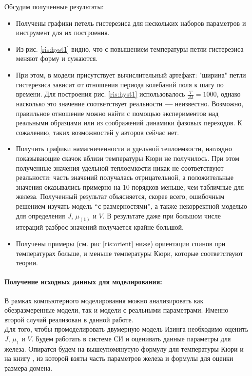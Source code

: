 \documentclass[oneside,final,14pt]{extarticle}
\begin{document}
	\noindent Обсудим полученные результаты:
	\begin{itemize}
		\item Получены графики петель гистерезиса для нескольких наборов параметров и инструмент для их построения.
		\item Из рис. \ref{ris:hyst1} видно, что с повышением температуры петли гистерезиса меняют форму и сужаются. 
		\item При этом, в модели присутствует вычислительный артефакт: "ширина" петли гистерезиса зависит от отношения периода колебаний поля к шагу по времени. Для построения рис. \ref{ris:hyst1} использовалось $\frac{T}{\Delta t}=1000$, однако насколько это значение соответствует реальности \textbf{---} неизвестно. Возможно, правильное отношение можно найти с помощью экспериментов над реальными образцами или из соображений динамики фазовых переходов. К сожалению, таких возможностей у авторов сейчас нет. 
		\item Получить графики намагниченности и удельной теплоемкости, наглядно показывающие скачок вблизи температуры Кюри не получилось. При этом полученные значения удельной теплоемкости никак не соответствуют реальности: часть значений получалась отрицательной, а положительные значения оказывались примерно на 10 порядков меньше, чем табличные для железа. Полученный результат объясняется, скорее всего, ошибочным решением изучать модель ``с размерностями'', а также некорректной моделью для определения $J$, $\mu_{(1)}$ и $V$. В результате даже при большом числе итераций разброс значений получается крайне большой.
		\item Получены примеры (см. рис \ref{ris:orient} ниже) ориентации спинов при температурах больше, и меньше температуры Кюри, которые соответствуют теории. 
	\end{itemize}
	
	\newpage
	\paragraph{Получение исходных данных для моделирования:}	
	В рамках компьютерного моделирования можно анализировать как обезразмеренные модели, так и модели с реальными параметрами. Именно второй случай реализован в данной работе. \\
	
	\noindent Для того, чтобы промоделировать двумерную модель Изинга необходимо оценить $J$, $\mu_{1}$ и $V$. Будем работать в системе СИ и оценивать данные параметры для железа. Опиратся будем на вышеупомянутую формулу для температуры Кюри и на книгу \cite{magn}, из которой взяты часть параметров железа и формулы для оценки размера домена. \\
	
\end{document}

